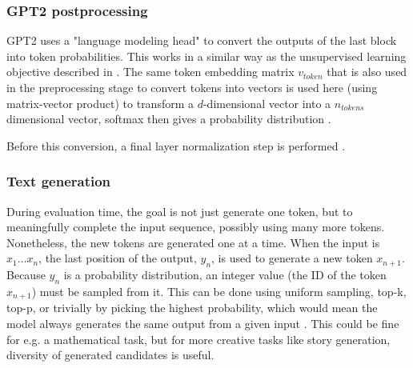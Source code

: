 \subsubsection{GPT2 postprocessing}


\label{gpt2:postproc}

GPT2 uses a "language modeling head" \cite{HuggingFaceGPT2} to convert the outputs of the last block into token probabilities. This works in a similar way as the unsupervised learning objective described in . The same token embedding matrix $v_{token}$ that is also used in the preprocessing stage to convert tokens into vectors is used here (using matrix-vector product) to transform a $d$-dimensional vector into a $n_{tokens}$ dimensional vector, softmax then gives a probability distribution \cite{github-hf} .

Before this conversion, a final layer normalization step is performed .


\subsubsection{Text generation}


During evaluation time, the goal is not just generate one token, but to meaningfully complete the input sequence, possibly using many more tokens.
Nonetheless, the new tokens are generated one at a time. When the input is $x_1 \ldots x_n$, the last position of the output, $y_n$, is used to generate a new token $x_{n+1}$.
Because $y_n$ is a probability distribution, an integer value (the ID of the token $x_{n+1}$) must be sampled from it. This can be done using uniform sampling,
top-k, top-p, or trivially by picking the highest probability, which would mean the model always generates the same output from a given input \cite{hf-howtogeneratetext}.
This could be fine for e.g. a mathematical task, but for more creative tasks like story generation, diversity of generated candidates is useful.

